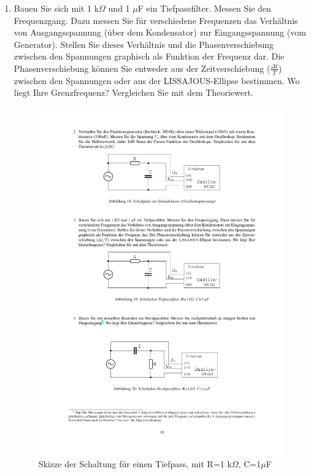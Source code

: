 \documentclass[12pt]{scrartcl}
\begin{document}
\begin{enumerate}
\item
Bauen Sie sich mit 1 k$\Omega$ und 1
$\mu$F ein Tiefpassfilter. Messen Sie den Frequenzgang. Dazu messen Sie für
verschiedene Frequenzen das Verhältnis von Ausgangsspannung (über dem Kondensator) zur Eingangsspannung (vom Generator). Stellen Sie dieses Verhältnis und die Phasenverschiebung zwischen den Spannungen graphisch als Funktion der Frequenz dar. Die Phasenverschiebung können Sie entweder aus der Zeitverschiebung ($\frac{\Delta t}{T}$) zwischen den Spannungen oder aus der LISSAJOUS-Ellipse bestimmen. Wo liegt Ihre Grenzfrequenz? Vergleichen Sie mit dem Theoriewert.
\begin{figure}[htbp] 
  \centering
    \includegraphics[trim = 1mm 225mm 1mm 37mm, clip, scale = 1]{tiefpass.pdf}
  	\caption[Skizze der Schaltung für einen Tiefpass, mit R=1 k$\Omega$, C=1$\mu$F]{Skizze der Schaltung für einen Tiefpass, mit R=1 k$\Omega$, C=1$\mu$F\footnotemark}

\end{figure}
\end{enumerate}
\end{document}
